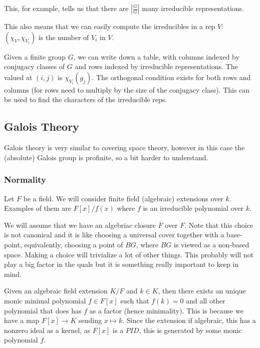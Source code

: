 \documentclass[main.tex]{subfiles}
\begin{document}
This, for example, tells us that there are $|\frac{G}{G}|$ many irreducible representations.

This also means that we can easily compute the irreducibles in a rep $V$: $(\chi_V, \chi_{V_i})$ is the number of $V_i$ in $V$.

Given a finite group $G$, we can write down a table, with columns indexed by conjugacy classes of $G$ and rows indexed by irreducible representations. The valued at $(i,j)$ is $\chi_{V_i}(g_j)$. The orthogonal condition exists for both rows and columns (for rows need to multiply by the size of the conjugacy class). This can be used to find the characters of the irreducible reps.




\subsection{Galois Theory}

Galois theory is very similar to covering space theory, however in this case the (absolute) Galois group is profinite, so a bit harder to understand. 

\subsubsection{Normality}


Let $F$ be a field. We will consider finite field (algebraic) extensions over $k$. Examples of them are  $F[x]/f(x)$ where $f$ is an irreducible polynomial over $k$. 
\begin{remark}
We will assume that we have an algebriac closure $\overline{F}$ over $F$. Note that this choice is not canonical and it is like choosing a universal cover together with a base-point, equivalently, choosing a point of $BG$, where $BG$ is viewed as a non-based space. Making a choice will trivialize a lot of other things. This probably will not play a big factor in the quals but it is something really important to keep in mind.
\end{remark}

Given an algebraic field extension $K/F$ and $k \in K$, then there exists an unique monic minimal polynomial $f \in F[x]$ such that $f(k) = 0$ and all other polynomial that does has $f$ as a factor (hence minimality). This is because we have a map $F[x] \rightarrow K$ sending $x \mapsto k$. Since the extension if algebraic, this has a nonzero ideal as a kernel, as $F[x]$ is a $PID$, this is generated by some monic polynomial $f$.
\end{document}

